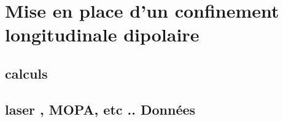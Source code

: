 \chapter{Mise en place d'un confinement longitudinale dipolaire}
\minitoc
\section{calculs}
\section{laser , MOPA, etc .. Données}

\annex




\newpage
\printindex
\printindex[pers]
			            
